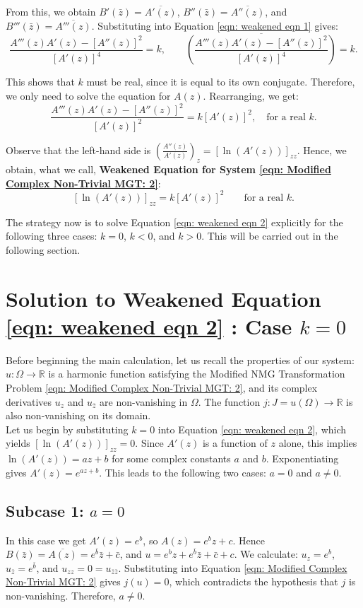 \documentclass[12pt]{article}
\theoremstyle{plain}
\theoremstyle{definition}
\theoremstyle{remark}
\begin{document}
From this, we obtain \(B'(\bar{z}) = \overline{A'(z)}\), \(B''(\bar{z}) = \overline{A''(z)}\), and \(B'''(\bar{z}) = \overline{A'''(z)}\). Substituting into Equation \ref{eqn: weakened eqn 1} gives:
\[
\frac{A'''(z) A'(z) - [A''(z)]^2}{[A'(z)]^4} = k,
\qquad
\overline{\left( \frac{A'''(z) A'(z) - [A''(z)]^2}{[A'(z)]^4} \right)} = k.
\]

This shows that \(k\) must be real, since it is equal to its own conjugate. Therefore, we only need to solve the equation for \(A(z)\). Rearranging, we get:
\[
\frac{A'''(z) A'(z) - [A''(z)]^2}{[A'(z)]^2} = k [A'(z)]^2, \quad \text{for a real } k.
\]

Observe that the left-hand side is \(\left( \frac{A''(z)}{A'(z)} \right)_z = [\ln(A'(z))]_{zz}\). Hence, we obtain, what we call, \textbf{Weakened Equation for System \ref{eqn: Modified Complex Non-Trivial MGT: 2}}:
\begin{equation}
	\label{eqn: weakened eqn 2}
	\boxed{[\ln(A'(z))]_{zz} = k  [A'(z)]^2}
	\qquad
	\boxed{\text{for a real } k}.
\end{equation}

The strategy now is to solve Equation \ref{eqn: weakened eqn 2} explicitly for the following three cases: \(k = 0\), \(k < 0\), and \(k > 0\). This will be carried out in the following section.

\section{Solution to Weakened Equation \ref{eqn: weakened eqn 2} : Case \(k=0\)}
Before beginning the main calculation, let us recall the properties of our system: \(u : \Omega \longrightarrow \mathbb{R}\) is a harmonic function satisfying the Modified NMG Transformation Problem \ref{eqn: Modified Complex Non-Trivial MGT: 2}, and its complex derivatives \(u_z\) and \(u_{\bar{z}}\) are non-vanishing in \(\Omega\). The function \(j : J = u(\Omega) \longrightarrow \mathbb{R}\) is also non-vanishing on its domain.\\

Let us begin by substituting \(k = 0\) into Equation \ref{eqn: weakened eqn 2}, which yields \([\ln(A'(z))]_{zz} = 0\). Since \(A'(z)\) is a function of \(z\) alone, this implies \(\ln(A'(z)) = a z + b\) for some complex constants \(a\) and \(b\). Exponentiating gives \(A'(z) = e^{a z + b}\). This leads to the following two cases: \(a = 0\) and \(a \neq 0\).

\subsection{Subcase 1: \(a = 0\)}
In this case we get \(A'(z) = e^{b}\), so \(A(z) = e^{b} z + c\). Hence \(B(\bar{z}) = \overline{A(z)} = e^{\bar{b}} \bar{z} + \bar{c}\), and \(u = e^{b} z + e^{\bar{b}} \bar{z} + \bar{c} + c\). We calculate: \(u_z = e^{b}\), \(u_{\bar{z}} = e^{\bar{b}}\), and \(u_{zz} = 0 = u_{\bar{z}\bar{z}}\). Substituting into Equation \ref{eqn: Modified Complex Non-Trivial MGT: 2} gives \(j(u) = 0\), which contradicts the hypothesis that \(j\) is non-vanishing. Therefore, \(a \neq 0\).
\end{document}
